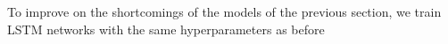 To improve on the shortcomings of the models of the previous section, we train LSTM networks with the same hyperparameters as before